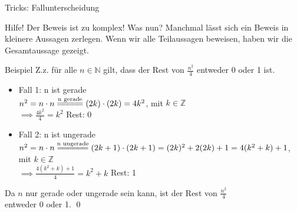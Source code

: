 %
%
%
%

\begin{frame}[fragile]{Tricks: Fallunterscheidung}
	\begin{alertblock}{Hilfe! Der Beweis ist zu komplex! Was nun?}
		Manchmal lässt sich ein Beweis in kleinere Aussagen zerlegen. Wenn wir alle Teilaussagen beweisen, haben wir die Gesamtaussage gezeigt.
	\end{alertblock}
	\small\begin{exampleblock}{Beispiel}
		Z.z. für alle $n\in\mathbb{N}$ gilt, dass der Rest von $\frac{n^2}{4}$ entweder 0 oder 1 ist.
		\footnotesize\begin{itemize}
			\item
			      \alert{Fall 1:} n ist gerade\\
			      $n^2=n\cdot n\overset{\text{n gerade}}{=\joinrel=\joinrel=\joinrel=\joinrel=}(2k)\cdot(2k) = 4k^2$,  mit $k\in\mathbb{Z}$\\
			      $\implies \frac{4k^2}{4} = k^2$ Rest: 0
			\item \alert{Fall 2:} n ist ungerade\\
			      $n^2=n\cdot n\overset{\text{n ungerade}}{=\joinrel=\joinrel=\joinrel=\joinrel=\joinrel=}(2k+1)\cdot(2k+1)=(2k)^2+2(2k)+1=4(k^2+k)+1$, \\mit $k\in\mathbb{Z}$\\
			      $\implies \frac{4(k^2+k)+1}{4}= k^2+k$ Rest: 1
		\end{itemize}
		Da $n$ nur gerade oder ungerade sein kann, ist der Rest von $\frac{n^2}{4}$ \\entweder 0 oder 1. \qed\;
	\end{exampleblock}
\end{frame}

